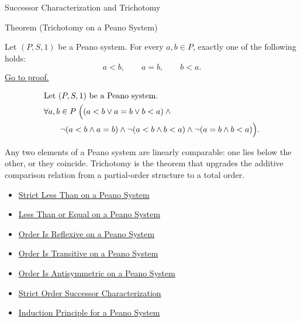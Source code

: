 \begin{topicbox}{Successor Characterization and Trichotomy}
\begin{theorembox}{Theorem (Trichotomy on a Peano System)}
\begin{theorem}
\label{thm:trichotomy-on-peano-system}
Let $(P,S,1)$ be a Peano system. For every $a,b \in P$, exactly one of the
following holds:
\[
a<b,\qquad a=b,\qquad b<a.
\]
\hyperref[prf:trichotomy-on-peano-system]{Go to proof.}
\end{theorem}
\end{theorembox}

\begin{remark*}
\[
\begin{aligned}
&\text{Let } (P,S,1) \text{ be a Peano system.}\\
&\forall a,b \in P\;
\Bigl(
(a<b \lor a=b \lor b<a) \land {}\\
&\qquad\neg(a<b \land a=b) \land
\neg(a<b \land b<a) \land
\neg(a=b \land b<a)
\Bigr).
\end{aligned}
\]
\end{remark*}

\begin{remark*}[Interpretation]
Any two elements of a Peano system are linearly comparable: one lies below the
other, or they coincide. Trichotomy is the theorem that upgrades the additive
comparison relation from a partial-order structure to a total order.
\end{remark*}

\begin{dependencies}
\begin{itemize}
  \item \hyperref[def:strict-less-than-on-peano-system]{Strict Less Than on a Peano System}
  \item \hyperref[def:less-than-or-equal-on-peano-system]{Less Than or Equal on a Peano System}
  \item \hyperref[thm:order-reflexive-on-peano-system]{Order Is Reflexive on a Peano System}
  \item \hyperref[thm:order-transitive-on-peano-system]{Order Is Transitive on a Peano System}
  \item \hyperref[thm:order-antisymmetric-on-peano-system]{Order Is Antisymmetric on a Peano System}
  \item \hyperref[thm:strict-order-successor-characterization]{Strict Order Successor Characterization}
  \item \hyperref[thm:induction-principle-for-peano-system]{Induction Principle for a Peano System}
\end{itemize}
\end{dependencies}


\end{topicbox}
